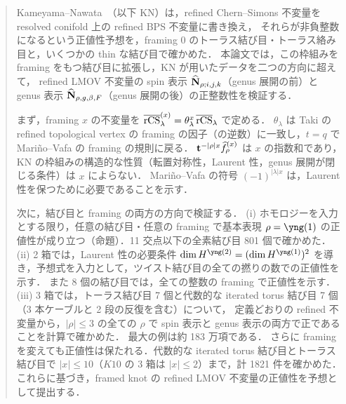 \begin{abstract}
Kameyama--Nawata~\cite{Kameyama17}（以下 KN）は，refined Chern--Simons 不変量を resolved conifold 上の refined BPS 不変量に書き換え，
それらが非負整数になるという正値性予想を，framing 0 のトーラス結び目・トーラス絡み目と，いくつかの thin な結び目で確かめた．
本論文では，この枠組みを framing をもつ結び目に拡張し，KN が用いたデータを二つの方向に超えて，
refined LMOV 不変量の spin 表示 $\hbN_{\rho;i,j,k}$（genus 展開の前）と genus 表示 $\hbN_{\rho,g,\beta,F}$（genus 展開の後）の正整数性を検証する．

まず，framing $x$ の不変量を $\overline{\rCS}^{(x)}_\lambda=\theta_\lambda^x\,\overline{\rCS}_\lambda$ で定める．
$\theta_\lambda$ は Taki の refined topological vertex の framing の因子（の逆数）に一致し，$t=q$ で Mariño--Vafa の framing の規則に戻る．
$\bt^{-|\rho|x}\hf^{(x)}_\rho$ は $x$ の指数和であり，KN の枠組みの構造的な性質（転置対称性，Laurent 性，genus 展開が閉じる条件）は $x$ によらない．
Mariño--Vafa の符号 $(-1)^{|\lambda|x}$ は，Laurent 性を保つために必要であることを示す．

次に，結び目と framing の両方の方向で検証する．
(i) ホモロジーを入力とする限り，任意の結び目・任意の framing で基本表現 $\rho=\yng(1)$ の正値性が成り立つ（命題）．11 交点以下の全素結び目 801 個で確かめた．
(ii) 2 箱では，Laurent 性の必要条件 $\dim H^{\yng(2)}=(\dim H^{\yng(1)})^2$ を導き，予想式を入力として，ツイスト結び目の全ての撚りの数での正値性を示す．
また 8 個の結び目では，全ての整数の framing で正値性を示す．
(iii) 3 箱では，トーラス結び目 7 個と代数的な iterated torus 結び目 7 個（3 本ケーブルと 2 段の反復を含む）について，
定義どおりの refined 不変量から，$|\rho|\le 3$ の全ての $\rho$ で spin 表示と genus 表示の両方で正であることを計算で確かめた．
最大の例は約 183 万項である．
さらに framing を変えても正値性は保たれる．代数的な iterated torus 結び目とトーラス結び目で $|x|\le10$（$K10$ の 3 箱は $|x|\le2$）まで，計 1821 件を確かめた．
これらに基づき，framed knot の refined LMOV 不変量の正値性を予想として提出する．
\end{abstract}
